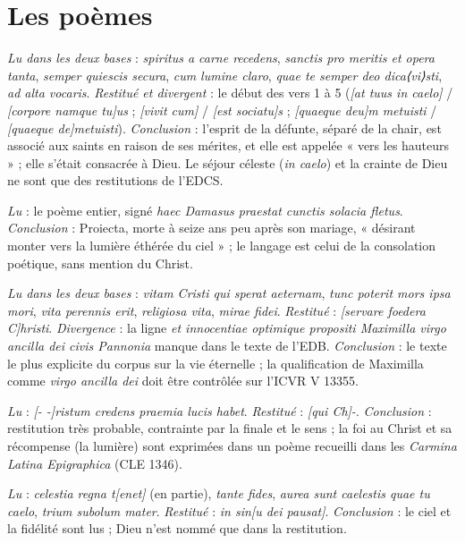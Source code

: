 \section{Les poèmes}

\begin{description}[style=nextline,leftmargin=1.5em,font=\normalfont\bfseries]
\item[\nnum{73} (363) — Eleuteria (p.~\pageref{dos:73})] \emph{Lu dans les deux bases} : \emph{spiritus a carne recedens}, \emph{sanctis pro meritis et opera tanta}, \emph{semper quiescis secura}, \emph{cum lumine claro}, \emph{quae te semper deo dica⟨vi⟩sti}, \emph{ad alta vocaris}. \emph{Restitué et divergent} : le début des vers 1 à 5 (\emph{[at tuus in caelo]} / \emph{[corpore namque tu]us} ; \emph{[vivit cum]} / \emph{[est sociatu]s} ; \emph{[quaeque deu]m metuisti} / \emph{[quaeque de]metuisti}). \emph{Conclusion} : l’esprit de la défunte, séparé de la chair, est associé aux saints en raison de ses mérites, et elle est appelée « vers les hauteurs » ; elle s’était consacrée à Dieu. Le séjour céleste (\emph{in caelo}) et la crainte de Dieu ne sont que des restitutions de l’EDCS.
\item[\nnum{244} (383) — Proiecta, par Damase (p.~\pageref{dos:244})] \emph{Lu} : le poème entier, signé \emph{haec Damasus praestat cunctis solacia fletus}. \emph{Conclusion} : Proiecta, morte à seize ans peu après son mariage, « désirant monter vers la lumière éthérée du ciel » ; le langage est celui de la consolation poétique, sans mention du Christ.
\item[\nnum{306} (389) — Maximilla et Lucceia (p.~\pageref{dos:306})] \emph{Lu dans les deux bases} : \emph{vitam Cristi qui sperat aeternam}, \emph{tunc poterit mors ipsa mori}, \emph{vita perennis erit}, \emph{religiosa vita}, \emph{mirae fidei}. \emph{Restitué} : \emph{[servare foedera C]hristi}. \emph{Divergence} : la ligne \emph{et innocentiae optimique propositi Maximilla virgo ancilla dei civis Pannonia} manque dans le texte de l’EDB. \emph{Conclusion} : le texte le plus explicite du corpus sur la vie éternelle ; la qualification de Maximilla comme \emph{virgo ancilla dei} doit être contrôlée sur l’ICVR V 13355.
\item[\nnum{352} (393) — Eutychius (p.~\pageref{dos:352})] \emph{Lu} : \emph{[- -]ristum credens praemia lucis habet}. \emph{Restitué} : \emph{[qui Ch]-}. \emph{Conclusion} : restitution très probable, contrainte par la finale et le sens ; la foi au Christ et sa récompense (la lumière) sont exprimées dans un poème recueilli dans les \emph{Carmina Latina Epigraphica} (CLE 1346).
\item[\nnum{382} (395) — Panthagate (p.~\pageref{dos:382})] \emph{Lu} : \emph{celestia regna t[enet]} (en partie), \emph{tante fides}, \emph{aurea sunt caelestis quae tu caelo}, \emph{trium subolum mater}. \emph{Restitué} : \emph{in sin[u dei pausat]}. \emph{Conclusion} : le ciel et la fidélité sont lus ; Dieu n’est nommé que dans la restitution.
\end{description}

